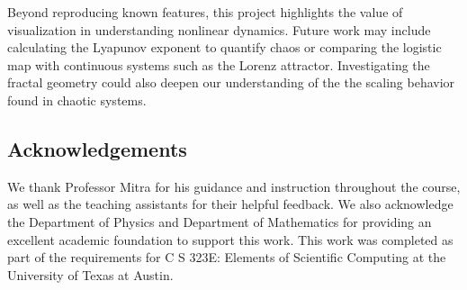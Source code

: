\documentclass[linenumbers, RNAAS, trackchanges]{aastex631}
\begin{document}
Beyond reproducing known features, this project highlights the value of
visualization in understanding nonlinear dynamics. Future work may include
calculating the Lyapunov exponent to quantify chaos or comparing the logistic
map with continuous systems such as the Lorenz attractor. Investigating the 
fractal geometry could also deepen our understanding of the the scaling
behavior found in chaotic systems.


\subsection{Acknowledgements}
We thank Professor Mitra for his guidance and instruction throughout the course,
as well as the teaching assistants for their helpful feedback. We also
acknowledge the Department of Physics and Department of Mathematics for providing 
an excellent academic foundation to support this work. This work was completed as part of the 
requirements for C S 323E: Elements of Scientific Computing at the University
of Texas at Austin.

\newpage


\end{document}

